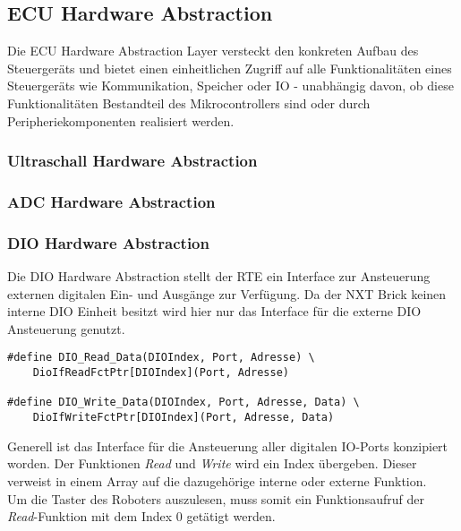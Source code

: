 \subsection{ECU Hardware Abstraction}

Die ECU Hardware Abstraction Layer versteckt den konkreten Aufbau des Steuergeräts und bietet einen einheitlichen Zugriff auf alle Funktionalitäten eines Steuergeräts wie Kommunikation, Speicher oder IO - unabhängig davon, ob diese Funktionalitäten Bestandteil des Mikrocontrollers sind oder durch Peripheriekomponenten realisiert werden.


\subsubsection{Ultraschall Hardware Abstraction}


\subsubsection{ADC Hardware Abstraction}

\subsubsection{DIO Hardware Abstraction} \label{dio}

Die DIO Hardware Abstraction stellt der RTE ein Interface zur Ansteuerung externen digitalen Ein- und Ausgänge zur Verfügung. Da der NXT Brick keinen interne DIO Einheit besitzt wird hier nur das Interface für die externe DIO Ansteuerung genutzt.

\begin{lstlisting}[frame=single,caption={DIO Interface},captionpos=b]  
#define DIO_Read_Data(DIOIndex, Port, Adresse) \
	DioIfReadFctPtr[DIOIndex](Port, Adresse)
	
#define DIO_Write_Data(DIOIndex, Port, Adresse, Data) \
	DioIfWriteFctPtr[DIOIndex](Port, Adresse, Data)
\end{lstlisting}
Generell ist das Interface für die Ansteuerung aller digitalen IO-Ports konzipiert worden.
Der Funktionen \textit{Read} und \textit{Write} wird ein Index übergeben. Dieser verweist in einem Array auf die dazugehörige interne oder externe Funktion.\\
Um die Taster des Roboters auszulesen, muss somit ein Funktionsaufruf der \textit{Read}-Funktion mit dem Index 0 getätigt werden.

